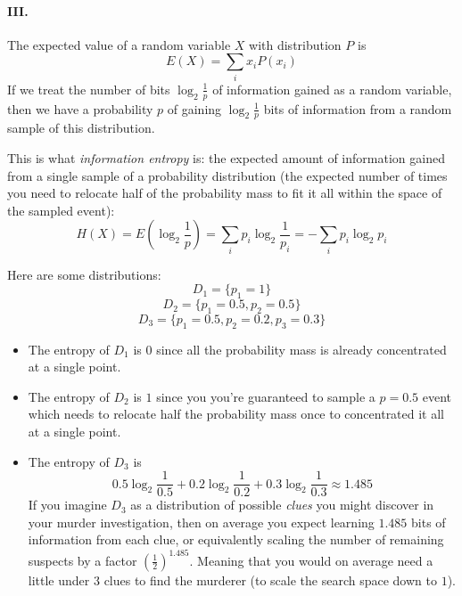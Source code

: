 \paragraph{III.}
The expected value of a random variable $X$ with distribution $P$ is
$$E(X)=\sum_{i}{}x_i P(x_i)$$
If we treat the number of bits $\log_2{\frac{1}{p}}$ of information gained as a random variable, then we have a probability $p$ of gaining $\log_2{\frac{1}{p}}$ bits of information from a random sample of this distribution.
\par
This is what \textit{information entropy} is: the expected amount of information gained from a single sample of a probability distribution (the expected number of times you need to relocate half of the probability mass to fit it all within the space of the sampled event): 
$$H(X)=E(\log_2{\frac{1}{p}})=\sum_{i} p_i\log_2{\frac{1}{p_i}}=-\sum_{i} p_i\log_2{p_i}$$
\par
Here are some distributions:
$$D_1=\{p_1=1\}$$
$$D_2=\{p_1=0.5, p_2=0.5\}$$
$$D_3=\{p_1=0.5, p_2=0.2, p_3=0.3\}$$
\begin{itemize}
    \item
        The entropy of $D_1$ is $0$ since all the probability mass is already concentrated at a single point.
    \item
        The entropy of $D_2$ is $1$ since you you're guaranteed to sample a $p=0.5$ event which needs to relocate half the probability mass once to concentrated it all at a single point.
    \item
        The entropy of $D_3$ is 
        $$0.5 \log_2{\frac{1}{0.5}} + 0.2 \log_2{\frac{1}{0.2}} + 0.3 \log_2{\frac{1}{0.3}}\approx 1.485$$
        If you imagine $D_3$ as a distribution of possible \textit{clues} you might discover in your murder investigation, then on average you expect learning $1.485$ bits of information from each clue, or equivalently scaling the number of remaining suspects by a factor $(\frac{1}{2})^{1.485}$. Meaning that you would on average need a little under $3$ clues to find the murderer (to scale the search space down to $1$).
\end{itemize}
